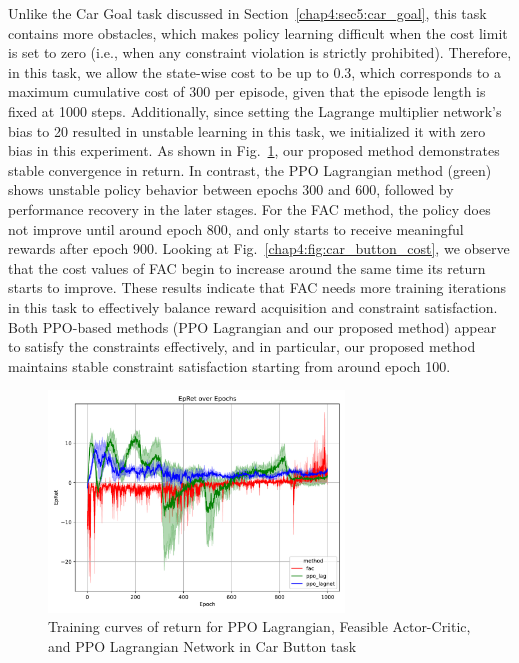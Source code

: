 Unlike the Car Goal task discussed in Section~\ref{chap4:sec5:car_goal}, this task contains more obstacles, which makes policy learning difficult when the cost limit is set to zero (i.e., when any constraint violation is strictly prohibited).
Therefore, in this task, we allow the state-wise cost to be up to 0.3, which corresponds to a maximum cumulative cost of 300 per episode, given that the episode length is fixed at 1000 steps.
Additionally, since setting the Lagrange multiplier network’s bias to 20 resulted in unstable learning in this task, we initialized it with zero bias in this experiment.
As shown in Fig.~\ref{chap4:fig:car_button_return}, our proposed method demonstrates stable convergence in return.
In contrast, the PPO Lagrangian method (green) shows unstable policy behavior between epochs 300 and 600, followed by performance recovery in the later stages.
For the FAC method, the policy does not improve until around epoch 800, and only starts to receive meaningful rewards after epoch 900.
Looking at Fig.~\ref{chap4:fig:car_button_cost}, we observe that the cost values of FAC begin to increase around the same time its return starts to improve.
These results indicate that FAC needs more training iterations in this task to effectively balance reward acquisition and constraint satisfaction.
Both PPO-based methods (PPO Lagrangian and our proposed method) appear to satisfy the constraints effectively, and in particular, our proposed method maintains stable constraint satisfaction starting from around epoch 100.

\begin{figure}[h]
  \centering
  \includegraphics[width=0.7\textwidth]{imgs/chap4/car_button/return.pdf}
  \caption{Training curves of return for PPO Lagrangian, Feasible Actor-Critic, and PPO Lagrangian Network in Car Button task}
  \label{chap4:fig:car_button_return}
\end{figure}

